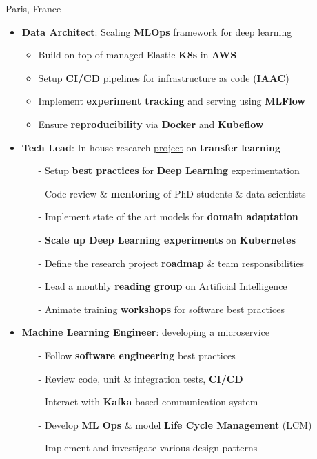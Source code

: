 \documentclass[10pt,a4paper,ragged2e]{altacv}
\begin{document}
\divider 

     {Paris, France}
\begin{itemize}
	\item \textbf{Data Architect}: Scaling \textbf{MLOps} framework for deep learning
	\vspace{0.3em}
	\begin{itemize}
		\item Build on top of managed Elastic \textbf{K8s} in \textbf{AWS}
		\item Setup \textbf{CI/CD} pipelines for infrastructure as code (\textbf{IAAC}) 
		\item Implement \textbf{experiment tracking} and serving using \textbf{MLFlow}
		\item Ensure \textbf{reproducibility} via \textbf{Docker} and \textbf{Kubeflow}
	\end{itemize}
    \item \textbf{Tech Lead}: In-house research \href{https://github.com/EricssonResearch/UDA-4-TSC}{project} on \textbf{transfer learning}
    \vspace{0.3em}
    \begin{itemize}
    	\item[-] Setup \textbf{best practices} for \textbf{Deep Learning} experimentation
        \item[-] Code review \& \textbf{mentoring} of PhD students \& data scientists
        \item[-] Implement state of the art models for \textbf{domain adaptation}
        \item[-] \textbf{Scale up Deep Learning experiments} on \textbf{Kubernetes}
        \item[-] Define the research project \textbf{roadmap} \& team responsibilities
        \item[-] Lead a monthly \textbf{reading group} on Artificial Intelligence
        \item[-] Animate training \textbf{workshops} for software best practices
    \end{itemize}
    \item \textbf{Machine Learning Engineer}: developing a microservice
    \vspace{0.3em}
    \begin{itemize}
        \item[-] Follow \textbf{software engineering} best practices
        \item[-] Review code, unit \& integration tests, \textbf{CI/CD}
        \item[-] Interact with \textbf{Kafka} based communication system 
        \item[-] Develop \textbf{ML Ops} \& model \textbf{Life Cycle Management} (LCM)
        \item[-] Implement and investigate various design patterns
    \end{itemize}
	

\end{itemize}
\end{document}
